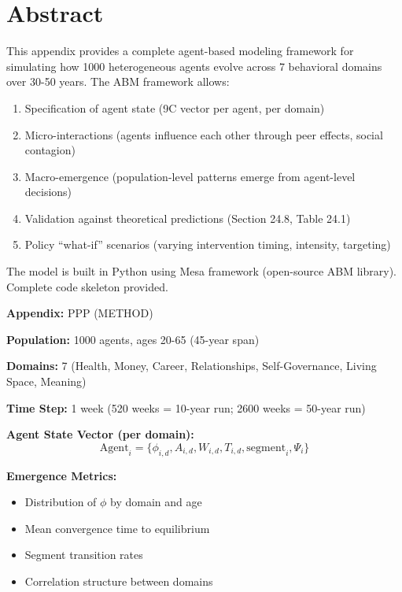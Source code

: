 
\section*{Abstract}

This appendix provides a complete agent-based modeling framework for simulating how 1000 heterogeneous agents evolve across 7 behavioral domains over 30-50 years. The ABM framework allows:

\begin{enumerate}[nosep]
\item Specification of agent state (9C vector per agent, per domain)
\item Micro-interactions (agents influence each other through peer effects, social contagion)
\item Macro-emergence (population-level patterns emerge from agent-level decisions)
\item Validation against theoretical predictions (Section 24.8, Table 24.1)
\item Policy ``what-if'' scenarios (varying intervention timing, intensity, targeting)
\end{enumerate}

The model is built in Python using Mesa framework (open-source ABM library). Complete code skeleton provided.


\begin{tcolorbox}[colback=blue!5!white, colframe=blue!75!black, title=Quick Reference: ABM Specifications]
\textbf{Appendix:} PPP (METHOD)


\textbf{Population:} 1000 agents, ages 20-65 (45-year span)

\textbf{Domains:} 7 (Health, Money, Career, Relationships, Self-Governance, Living Space, Meaning)

\textbf{Time Step:} 1 week (520 weeks = 10-year run; 2600 weeks = 50-year run)

\textbf{Agent State Vector (per domain):}
\[
\text{Agent}_i = \{\phi_{i,d}, A_{i,d}, W_{i,d}, T_{i,d}, \text{segment}_i, \Psi_i\}
\]

\textbf{Emergence Metrics:}
\begin{itemize}[nosep]
\item Distribution of $\phi$ by domain and age
\item Mean convergence time to equilibrium
\item Segment transition rates
\item Correlation structure between domains
\end{itemize}

\end{tcolorbox}

